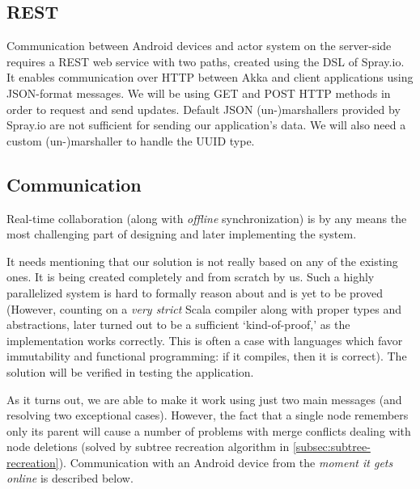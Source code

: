 %
%
%
%
%
\subsection{REST}
\label{subsec:restful}
 Communication between Android devices and actor system on the server-side requires a REST web service with two paths, created using the DSL of Spray.io. It enables communication over HTTP between Akka and client applications using JSON-format messages. We will be using GET and POST HTTP methods in order to request and send updates. Default JSON (un-)marshallers provided by Spray.io are not sufficient for sending our application's data. We will also need a custom (un-)marshaller to handle the UUID type.

\subsection{Communication}
\label{subsec:android-akka-comm}

Real-time collaboration (along with \emph{offline} synchronization) is by any means the most challenging part of designing and later implementing the system.

It needs mentioning that our solution is not really based on any of the existing ones. It is being created completely and from scratch by us. Such a highly parallelized system is hard to formally reason about and is yet to be proved (However, counting on a \emph{very strict} Scala compiler along with proper types and abstractions, later turned out to be a sufficient `kind-of-proof,' as the implementation works correctly. This is often a case with languages which favor immutability and functional programming: if it compiles, then it is correct). The solution will be verified in testing the application. 

As it turns out, we are able to make it work using just two main messages (and resolving two exceptional cases). However, the fact that a single node remembers only its parent will cause a number of problems with merge conflicts dealing with node deletions (solved by subtree recreation algorithm in \cref{subsec:subtree-recreation}). Communication with an Android device from the \emph{moment it gets online} is described below.


